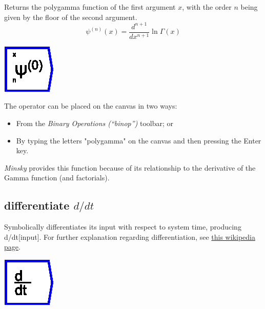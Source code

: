 \label{Operation:polygamma} Returns the polygamma function of the
first argument $x$, with the order $n$ being given by the floor
of the second argument. 
\[
\psi^{(n)}(x)=\frac{d^{n+1}}{dx^{n+1}}\ln\Gamma(x)
\]

\includegraphics{images/Polygamma}

The operator can be placed on the canvas in two ways:
\begin{itemize}
\item From the \emph{Binary Operations (``binop'')} toolbar; or 
\item By typing the letters "polygamma" on the canvas and then pressing
the Enter key.
\end{itemize}
\emph{Minsky} provides this function because of its relationship to
the derivative of the Gamma function (and factorials).

\subsection{differentiate $d/dt$}

\label{Operation:differentiate} Symbolically differentiates its input
with respect to system time, producing d/dt{[}input{]}. For further
explanation regarding differentiation, see \href{https://en.wikipedia.org/wiki/Derivative}{this wikipedia page}.

\includegraphics{images/differential}

